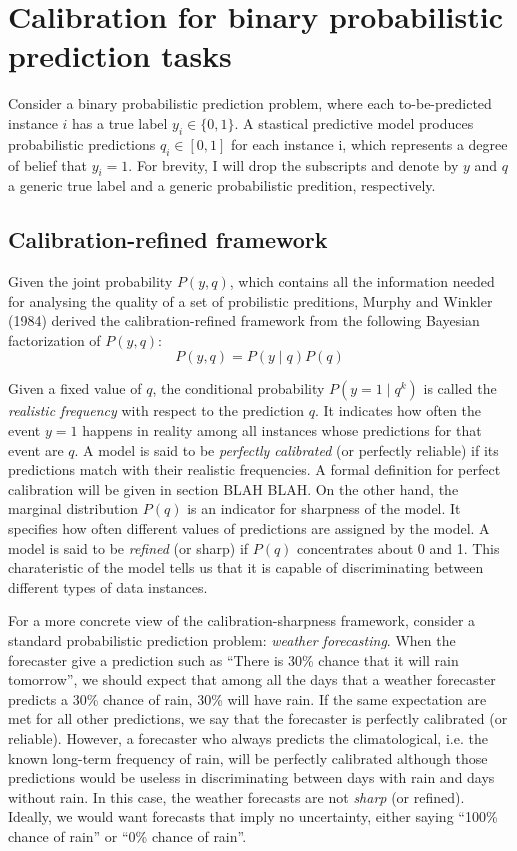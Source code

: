 \chapter{Calibration for binary probabilistic prediction tasks}

Consider a binary probabilistic prediction problem, where each to-be-predicted instance $i$ has a true label $y_i \in \{0, 1\}$. A stastical predictive model produces probabilistic predictions $q_i \in [0, 1]$ for each instance i, which represents a degree of belief that $y_i=1$. For brevity, I will drop the subscripts and denote by $y$ and $q$ a generic true label and a generic probabilistic predition, respectively. 

\section{Calibration-refined framework}

Given the joint probability $P(y, q)$, which contains all the information needed for analysing the quality of a set of probilistic preditions, Murphy and Winkler (1984) derived the calibration-refined framework from the following Bayesian factorization of $P(y, q)$:
\begin{equation}
  P(y, q) = P(y \mid q)P(q)
  \label{eqn:calib-ref-factor}
\end{equation}

Given a fixed value of $q$, the conditional probability $P(y = 1 \mid q^k)$ is called the \textit{realistic frequency} with respect to the prediction $q$. It indicates how often the event $y=1$ happens in reality among all instances whose predictions for that event are $q$. A model is said to be \textit{perfectly calibrated} (or perfectly reliable) if its predictions match with their realistic frequencies. A formal definition for perfect calibration will be given in section BLAH BLAH. On the other hand, the marginal distribution $P(q)$ is an indicator for sharpness of the model. It specifies how often different values of predictions are assigned by the model. A model is said to be \textit{refined} (or sharp) if $P(q)$ concentrates about 0 and 1. This charateristic of the model tells us that it is capable of discriminating between different types of data instances.   

For a more concrete view of the calibration-sharpness framework, consider a standard probabilistic prediction problem: \textit{weather forecasting}. When the forecaster give a prediction such as ``There is 30\% chance that it will rain tomorrow'', we should expect that among all the days that a weather forecaster predicts a 30\% chance of rain, 30\% will have rain. If the same expectation are met for all other predictions, we say that the forecaster is perfectly calibrated (or reliable). However, a forecaster who always predicts the climatological, i.e. the known long-term frequency of rain, will be perfectly calibrated although those predictions would be useless in discriminating between days with rain and days without rain. In this case, the weather forecasts are not \textit{sharp} (or refined). Ideally, we would want forecasts that imply no uncertainty, either saying ``100\% chance of rain'' or ``0\% chance of rain''. 

